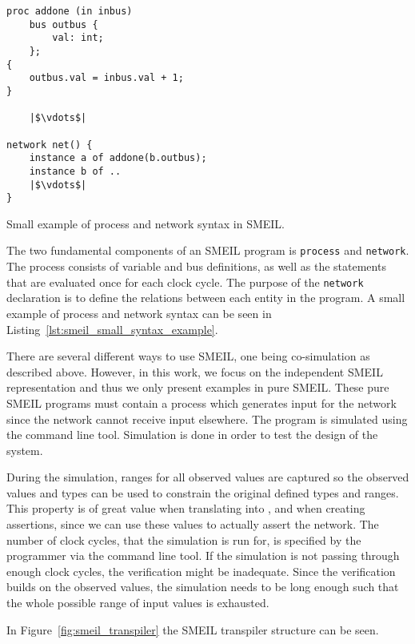 \begin{listing}
\begin{verbatim}
proc addone (in inbus)
    bus outbus {
        val: int;
    };
{
    outbus.val = inbus.val + 1;
}

    |$\vdots$|

network net() {
    instance a of addone(b.outbus);
    instance b of ..
    |$\vdots$|
}
\end{verbatim}
\caption{Small example of process and network syntax in SMEIL.}
\label{lst:smeil_small_syntax_example}
\end{listing}

The two fundamental components of an SMEIL program is \texttt{process} and \texttt{network}. The process consists of variable and bus definitions, as well as the statements that are evaluated once for each clock cycle. The purpose of the \texttt{network} declaration is to define the relations between each entity in the program. A small example of process and network syntax can be seen in Listing~\ref{lst:smeil_small_syntax_example}.

There are several different ways to use SMEIL, one being co-simulation as described above. However, in this work, we focus on the independent SMEIL representation and thus we only present examples in pure SMEIL. These pure SMEIL programs must contain a process which generates input for the network since the network cannot receive input elsewhere. The program is simulated using the command line tool. Simulation is done in order to test the design of the system.

During the simulation, ranges for all observed values are captured so the observed values and types can be used to constrain the original defined types and ranges. This property is of great value when translating into \cspm{}, and when creating assertions, since we can use these values to actually assert the network.
The number of clock cycles, that the simulation is run for, is specified by the programmer via the command line tool. If the simulation is not passing through enough clock cycles, the verification might be inadequate. Since the verification builds on the observed values, the simulation needs to be long enough such that the whole possible range of input values is exhausted.

In Figure~\ref{fig:smeil_transpiler} the SMEIL transpiler structure can be seen.

